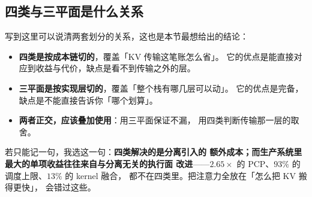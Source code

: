 \subsection{四类与三平面是什么关系}

写到这里可以说清两套划分的关系，这也是本节最想给出的结论：

\begin{itemize}[leftmargin=1.3em,itemsep=1.5pt,topsep=2pt]
  \item \textbf{四类是按成本链切的}，覆盖「KV 传输这笔账怎么省」。
        它的优点是能直接对应到收益与代价，缺点是看不到传输之外的层。
  \item \textbf{三平面是按实现层切的}，覆盖「整个栈有哪几层可以动」。
        它的优点是完备，缺点是不能直接告诉你「哪个划算」。
  \item \textbf{两者正交，应该叠加使用}：用三平面保证不漏，
        用四类判断传输那一层的取舍。
\end{itemize}

\noindent 若只能记一句，我选这一句：\textbf{四类解决的是分离引入的
额外成本；而生产系统里最大的单项收益往往来自与分离无关的执行面
改进}——$2.65\times$ 的 PCP、$93\%$ 的调度上限、$13\%$ 的 kernel 融合，
都不在四类里。把注意力全放在「怎么把 KV 搬得更快」，
会错过这些。

